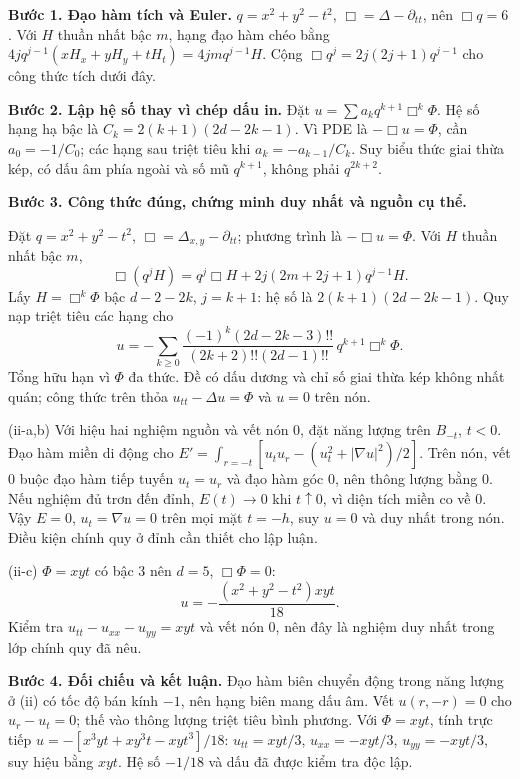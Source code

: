 \textbf{Bước 1. Đạo hàm tích và Euler.} $q=x^2+y^2-t^2$, $\Box=\Delta-\partial_{tt}$, nên $\Box q=6$. Với $H$ thuần nhất bậc $m$, hạng đạo hàm chéo bằng $4j q^{j-1}(xH_x+yH_y+tH_t)=4jm q^{j-1}H$. Cộng $\Box q^j=2j(2j+1)q^{j-1}$ cho công thức tích dưới đây.

\textbf{Bước 2. Lập hệ số thay vì chép dấu in.} Đặt $u=\sum a_kq^{k+1}\Box^k\Phi$. Hệ số hạng hạ bậc là $C_k=2(k+1)(2d-2k-1)$. Vì PDE là $-\Box u=\Phi$, cần $a_0=-1/C_0$; các hạng sau triệt tiêu khi $a_k=-a_{k-1}/C_k$. Suy biểu thức giai thừa kép, có dấu âm phía ngoài và số mũ $q^{k+1}$, không phải $q^{2k+2}$.

\textbf{Bước 3. Công thức đúng, chứng minh duy nhất và nguồn cụ thể.}

Đặt $q=x^2+y^2-t^2$, $\Box=\Delta_{x,y}-\partial_{tt}$; phương trình là $-\Box u=\Phi$. Với $H$ thuần nhất bậc $m$,
\[\Box(q^jH)=q^j\Box H+2j(2m+2j+1)q^{j-1}H.\]
Lấy $H=\Box^k\Phi$ bậc $d-2-2k$, $j=k+1$: hệ số là $2(k+1)(2d-2k-1)$. Quy nạp triệt tiêu các hạng cho
\[u=-\sum_{k\ge0}\frac{(-1)^k(2d-2k-3)!!}{(2k+2)!!(2d-1)!!}\,q^{k+1}\Box^k\Phi.\]
Tổng hữu hạn vì $\Phi$ đa thức. Đề có dấu dương và chỉ số giai thừa kép không nhất quán; công thức trên thỏa $u_{tt}-\Delta u=\Phi$ và $u=0$ trên nón.

(ii-a,b) Với hiệu hai nghiệm nguồn và vết nón 0, đặt năng lượng trên $B_{-t}$, $t<0$. Đạo hàm miền di động cho $E'=\int_{r=-t}[u_tu_r-(u_t^2+|\nabla u|^2)/2]$. Trên nón, vết 0 buộc đạo hàm tiếp tuyến $u_t=u_r$ và đạo hàm góc 0, nên thông lượng bằng 0. Nếu nghiệm đủ trơn đến đỉnh, $E(t)\to0$ khi $t\uparrow0$, vì diện tích miền co về 0. Vậy $E=0$, $u_t=\nabla u=0$ trên mọi mặt $t=-h$, suy $u=0$ và duy nhất trong nón. Điều kiện chính quy ở đỉnh cần thiết cho lập luận.

(ii-c) $\Phi=xyt$ có bậc 3 nên $d=5$, $\Box\Phi=0$:
\[u=-\frac{(x^2+y^2-t^2)xyt}{18}.\]
Kiểm tra $u_{tt}-u_{xx}-u_{yy}=xyt$ và vết nón 0, nên đây là nghiệm duy nhất trong lớp chính quy đã nêu.

\textbf{Bước 4. Đối chiếu và kết luận.} Đạo hàm biên chuyển động trong năng lượng ở (ii) có tốc độ bán kính $-1$, nên hạng biên mang dấu âm. Vết $u(r,-r)=0$ cho $u_r-u_t=0$; thế vào thông lượng triệt tiêu bình phương. Với $\Phi=xyt$, tính trực tiếp $u=-[x^3yt+xy^3t-xyt^3]/18$: $u_{tt}=xyt/3$, $u_{xx}=-xyt/3$, $u_{yy}=-xyt/3$, suy hiệu bằng $xyt$. Hệ số $-1/18$ và dấu đã được kiểm tra độc lập.
